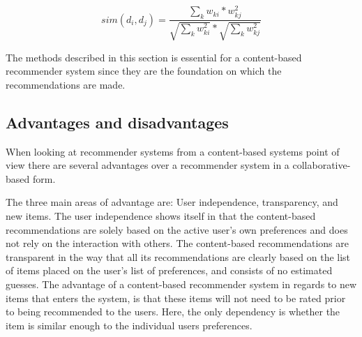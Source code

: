 \[
	sim({d_{i},d_{j}}) = \frac{\sum_{k}w_{ki}*w_{kj}^2}{\sqrt{\sum_{k}w_{ki}^2}*\sqrt{\sum_{k}w_{kj}^2}}
\]



The methods described in this section is essential for a content-based recommender system since they are the foundation on which the recommendations are made.

\subsection{Advantages and disadvantages}
When looking at recommender systems from a content-based systems point of view there are several advantages over a recommender system in a collaborative-based form.\newline

The three main areas of advantage are: User independence, transparency, and new items.\newline
The user independence shows itself in that the content-based recommendations are solely based on the active user's own preferences and does not rely on the interaction with others.\newline
The content-based recommendations are transparent in the way that all its recommendations are clearly based on the list of items placed on the user's list of preferences, and consists of no estimated guesses.\newline
The advantage of a content-based recommender system in regards to new items that enters the system, is that these items will not need to be rated prior to being recommended to the users. Here, the only dependency is whether the item is similar enough to the individual users preferences.\newline

